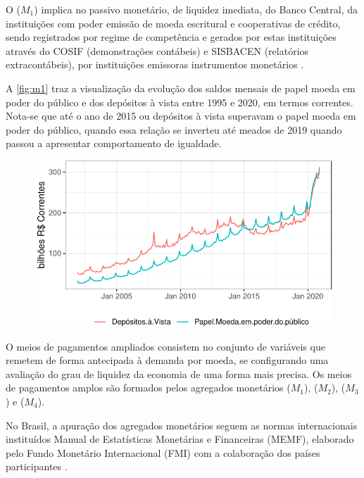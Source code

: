 \documentclass[12pt,12pt,openright,oneside,a4paper,chapter=TITLE,section=TITLE,subsection=TITLE,subsubsection=TITLE,english,french,spanish,portugues,sumario=tradicional]{abntex2}
\begin{document}
O (\(M_1\)) implica no passivo monetário, de liquidez imediata, do Banco Central, da instituições com poder emissão de moeda escritural e cooperativas de crédito, sendo registrados por regime de competência e gerados por estas instituições através do COSIF (demonstrações contábeis) e SISBACEN (relatórios extracontábeis), por instituições emissoras instrumentos monetários \cite{sgs:m1} \cite{sgs:mpa}.

A \autoref{fig:m1} traz a visualização da evolução dos saldos mensais de papel moeda em poder do público e dos depósitos à vista entre 1995 e 2020, em termos correntes. Nota-se que até o ano de 2015 ou depósitos à vista superavam o papel moeda em poder do público, quando essa relação se inverteu até meados de 2019 quando passou a apresentar comportamento de igualdade.

\begin{figure}

\begin{center}\includegraphics{12-exportedfigures/m1-1} \end{center}
\label{fig:m1}
\end{figure}

O meios de pagamentos ampliados consistem no conjunto de variáveis que remetem de forma antecipada à demanda por moeda, se configurando uma avaliação do grau de liquidez da economia de uma forma mais precisa. Os meios de pagamentos amplos são formados pelos agregados monetários (\(M_1\)), (\(M_2\)), (\(M_3\)) e (\(M_4\)).

No Brasil, a apuração dos agregados monetários seguem as normas internacionais instituídos Manual de Estatísticas Monetárias e Financeiras (MEMF), elaborado pelo Fundo Monetário Internacional (FMI) com a colaboração dos países participantes \cite{sgs:mpa}.
\end{document}
